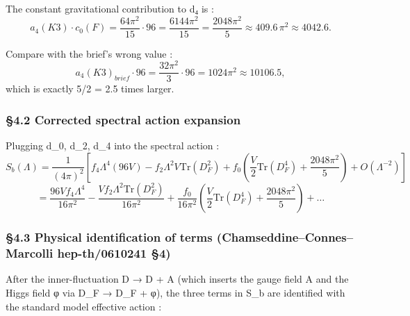 \documentclass[
  11pt,
  a4paper,
]{article}
\begin{document}
The constant gravitational contribution to d₄ is :
\[
a_4(K3) \cdot c_0(F) = \frac{64\pi^2}{15} \cdot 96 = \frac{6144\pi^2}{15} = \frac{2048\pi^2}{5} \approx 409.6 \, \pi^2 \approx 4042.6.
\]

Compare with the brief's wrong value :
\[
a_4(K3)_{brief} \cdot 96 = \frac{32\pi^2}{3} \cdot 96 = 1024\pi^2 \approx 10106.5,
\]
which is exactly 5/2 = 2.5 times larger.

\hypertarget{corrected-spectral-action-expansion}{%
\subsubsection{§4.2 Corrected spectral action expansion}\label{corrected-spectral-action-expansion}}

Plugging d\_0, d\_2, d\_4 into the spectral action :
\[
S_b(\Lambda) = \frac{1}{(4\pi)^2}\left[ f_4 \Lambda^4 (96 V) - f_2 \Lambda^2 V \mathrm{Tr}(D_F^2) + f_0 \left( \frac{V}{2}\mathrm{Tr}(D_F^4) + \frac{2048\pi^2}{5} \right) + O(\Lambda^{-2}) \right]
\]
\[
= \frac{96 V f_4 \Lambda^4}{16\pi^2} - \frac{V f_2 \Lambda^2 \mathrm{Tr}(D_F^2)}{16\pi^2} + \frac{f_0}{16\pi^2} \left( \frac{V}{2} \mathrm{Tr}(D_F^4) + \frac{2048\pi^2}{5} \right) + \dots
\]

\hypertarget{physical-identification-of-terms-chamseddineconnesmarcolli-hep-th0610241-4}{%
\subsubsection{§4.3 Physical identification of terms (Chamseddine--Connes--Marcolli hep-th/0610241 §4)}\label{physical-identification-of-terms-chamseddineconnesmarcolli-hep-th0610241-4}}

After the inner-fluctuation D → D + A (which inserts the gauge field A and the Higgs field φ via D\_F → D\_F + φ), the three terms in S\_b are identified with the standard model effective action :
\end{document}
